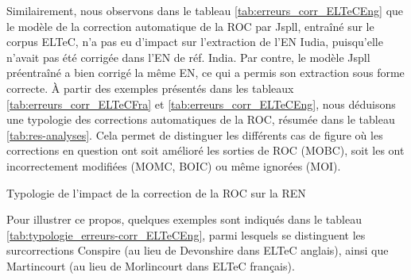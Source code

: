 Similairement, nous observons dans le tableau \ref{tab:erreurs_corr_ELTeCEng} que le modèle de la correction automatique de la ROC par Jspll, entraîné sur le corpus ELTeC, n'a pas eu d'impact sur l'extraction de l'EN \og{}Iudia\fg{}, puisqu'elle n'avait pas été corrigée dans l'EN de réf. \og{}India\fg{}. Par contre, le modèle Jspll préentraîné a bien corrigé la même EN, ce qui a permis son extraction sous forme correcte.
À partir des exemples présentés dans les tableaux \ref{tab:erreurs_corr_ELTeCFra} et \ref{tab:erreurs_corr_ELTeCEng}, nous déduisons une typologie des corrections automatiques de la ROC, résumée dans le tableau \ref{tab:res-analyses}. Cela permet de distinguer les différents cas de figure où les corrections en question ont soit amélioré les sorties de ROC (MOBC), soit les ont incorrectement modifiées (MOMC, BOIC) ou même ignorées (MOI).
\begin{table}[h!]
\scriptsize
    \centering
    
    \caption{Typologie de l'impact de la correction de la ROC sur la REN}
    \label{tab:res-analyses}
\end{table}

Pour illustrer ce propos, quelques exemples sont indiqués dans le tableau \ref{tab:typologie_erreurs-corr_ELTeCEng}, 
parmi lesquels se distinguent les surcorrections \og{}Conspire\fg{}
(au lieu de \og{}Devonshire\fg{}
dans ELTeC anglais), ainsi que \og{}Martincourt\fg{} (au lieu de \og{}Morlincourt\fg{} dans ELTeC français).

\begin{table}[h!]
    \centering
    \scriptsize
   
    \caption{Exemples illustrant la typologie de l'impact de la correction de la ROC sur la REN pour les configurations avec \texttt{spaCy\_lg}. 
    {\normalfont Home influence}, Aguillar et {\normalfont Mon village}, Adam, \textit{small}-ELTec-\{en, fr\}
    }
    \label{tab:typologie_erreurs-corr_ELTeCEng}
\end{table}

